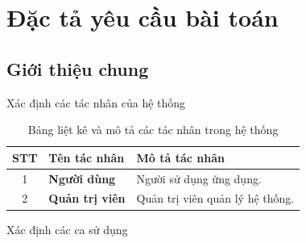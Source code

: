 \newpage
\section{Đặc tả yêu cầu bài toán}

\subsection{Giới thiệu chung}
Xác định các tác nhân của hệ thống
\noindent
\begin{table}[H]
    \centering
    \small %
    \renewcommand{\arraystretch}{1.5} %
    \setlength{\tabcolsep}{10pt} %
    
    \begin{tabularx}{\textwidth}{|c|>{\RaggedRight\arraybackslash\bfseries}p{4cm}|X|}
        \hline
        \rowcolor{gray!20} 
        \textbf{STT} & \textbf{Tên tác nhân} & \textbf{Mô tả tác nhân} \\ \hline
        
        1 & Người dùng & Người sử dụng ứng dụng. \\ \hline
        
        2 & Quản trị viên & Quản trị viên quản lý hệ thống. \\ \hline
    \end{tabularx}
    \caption{Bảng liệt kê và mô tả các tác nhân trong hệ thống}
    \label{tab:tac-nhan}
\end{table}
Xác định các ca sử dụng
